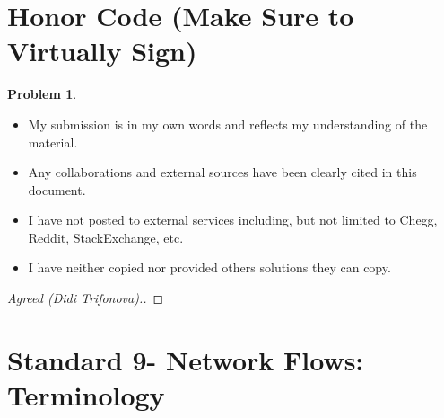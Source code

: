 \documentclass[11pt]{article}
\theoremstyle{definition}
\theoremstyle{definition}
\newtheorem{required}{Problem}
\theoremstyle{definition}
\begin{document}
\section{Honor Code (Make Sure to Virtually Sign)} \label{HonorCode}

\begin{required}
\begin{itemize}
\item My submission is in my own words and reflects my understanding of the material.
\item Any collaborations and external sources have been clearly cited in this document.
\item I have not posted to external services including, but not limited to Chegg, Reddit, StackExchange, etc.
\item I have neither copied nor provided others solutions they can copy.
\end{itemize}

\end{required}

\begin{proof}[Agreed (Didi Trifonova).]
\end{proof}




\newpage
\section{Standard 9- Network Flows: Terminology}
\end{document}
